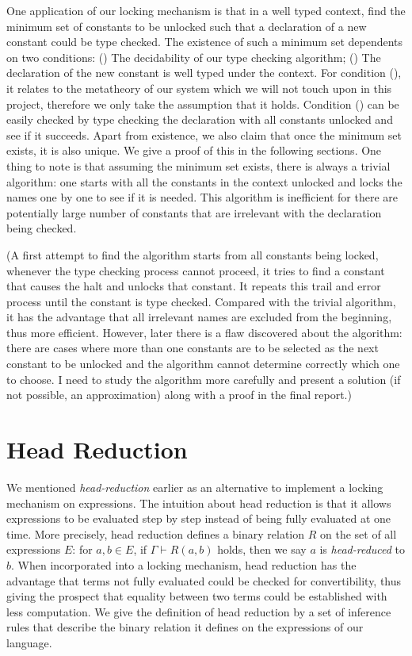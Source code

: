 One application of our locking mechanism is that in a well typed context, find the minimum set of constants to be unlocked such that a declaration of a new constant could be type checked. The existence of such a minimum set dependents on two conditions: () The decidability of our type checking algorithm; () The declaration of the new constant is well typed under the context. For condition (), it relates to the metatheory of our system which we will not touch upon in this project, therefore we only take the assumption that it holds. Condition () can be easily checked by type checking the declaration with all constants unlocked and see if it succeeds. Apart from existence, we also claim that once the minimum set exists, it is also unique. We give a proof of this in the following sections. One thing to note is that assuming the minimum set exists, there is always a trivial algorithm: one starts with all the constants in the context unlocked and locks the names one by one to see if it is needed. This algorithm is inefficient for there are potentially large number of constants that are irrelevant with the declaration being checked.

(A first attempt to find the algorithm starts from all constants being locked, whenever the type checking process cannot proceed, it tries to find a constant that causes the halt and unlocks that constant. It repeats this trail and error process until the constant is type checked. Compared with the trivial algorithm, it has the advantage that all irrelevant names are excluded from the beginning, thus more efficient. However, later there is a flaw discovered about the algorithm: there are cases where more than one constants are to be selected as the next constant to be unlocked and the algorithm cannot determine correctly which one to choose. I need to study the algorithm more carefully and present a solution (if not possible, an approximation) along with a proof in the final report.)

\section{Head Reduction} \label{sec:head-red}
We mentioned \emph{head-reduction} earlier as an alternative to implement a locking mechanism on expressions. The intuition about head reduction is that it allows expressions to be evaluated step by step instead of being fully evaluated at one time. More precisely, head reduction defines a binary relation $R$ on the set of all expressions $E$: for $a, b \in E$, if $\Gamma \vdash R(a, b)$ holds, then we say $a$ is \emph{head-reduced} to $b$. When incorporated into a locking mechanism, head reduction has the advantage that terms not fully evaluated could be checked for convertibility, thus giving the prospect that equality between two terms could be established with less computation. We give the definition of head reduction by a set of inference rules that describe the binary relation it defines on the expressions of our language. 

